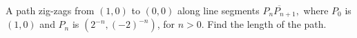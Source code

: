 A path zig-zags from $(1,0)$ to $(0,0)$ along line segments
$\overline{P_{n}P_{n+1}},$ where $P_{0}$ is $(1,0)$ and $P_{n}$ is
$(2^{-n},(-2)^{-n})$, for $n>0$. Find the length of the path.
